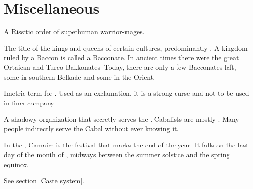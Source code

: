 \section{Miscellaneous}
\begin{gloss}



\begin{comment}
\subsubsection{A-G}
\end{comment}

\gitempl{\Ashenoch}{\Ashenoch}
A Rissitic order of superhuman warrior-mages. 



The title of the kings and queens of certain cultures, predominantly \scathaese{}. A kingdom ruled by a Baccon is called a Bacconate. In ancient times there were the great Ortaican and Turco Bakkonates. Today, there are only a few Bacconates left, some in southern Belkade and some in the Orient. 






Imetric term for . Used as an exclamation, it is a strong curse and not to be used in finer company. 




A shadowy organization that secretly serves the \banes. Cabalists are mostly \human{}. Many people indirectly serve the Cabal without ever knowing it. 



In the \ImperialCalendar, Camaire is the festival that marks the end of the year. It falls on the last day of the month of \Gamishiel{}, midways between the summer solstice and the spring equinox.
\also{\ImperialCalendar}



See section \ref{Caste system}. 







\end{gloss}
